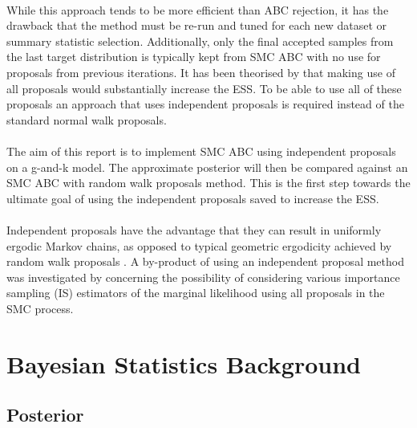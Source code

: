 \documentclass[12,fleqn]{article}
\theoremstyle{definition}
\theoremstyle{plain}
\begin{document}
\paragraph{}
While this approach tends to be more efficient than ABC rejection, it has the drawback that the method must be re-run and tuned for each new dataset or summary statistic selection. Additionally, only the final accepted samples from the last target distribution is typically kept from SMC ABC with no use for proposals from previous iterations.  It has been theorised by  that making use of all proposals would substantially increase the ESS. To be able to use all of these proposals an approach that uses independent proposals is required instead of the standard normal walk proposals. 
\par

\paragraph{}
The aim of this report is to implement SMC ABC using independent proposals on a g-and-k model. The approximate posterior will then be compared against an SMC ABC with random walk proposals method. This is the first step towards the ultimate goal of using the independent proposals saved to increase the ESS. 
\par

\paragraph{}
Independent proposals have the advantage that they can result in uniformly ergodic Markov chains, as opposed to typical geometric ergodicity achieved by random walk proposals \cite{tierney}. A by-product of using an independent proposal method was investigated by   concerning the possibility of considering various importance sampling (IS) estimators of the marginal likelihood using all proposals in the SMC process.
\par



\section{Bayesian Statistics Background}
\subsection{Posterior} 
\end{document}
